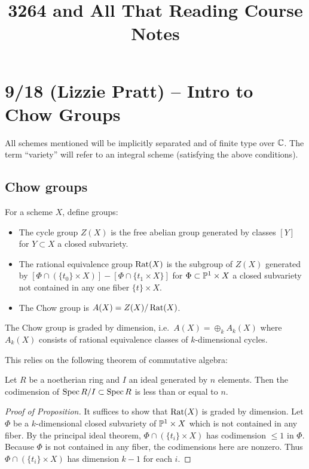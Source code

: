 \documentclass{article}
\title{3264 and All That Reading Course Notes}
\begin{document}
\maketitle

\tableofcontents

\section{9/18 (Lizzie Pratt) -- Intro to Chow Groups}

All schemes mentioned will be implicitly separated and of finite type over $\mathbb{C}$.
The term ``variety'' will refer to an integral scheme (satisfying the above conditions).

\subsection{Chow groups}

\begin{dfn}
	For a scheme $X$, define groups:
	\begin{itemize}
		\item The cycle group $Z(X)$ is the free abelian group generated by classes $[Y]$ for $Y \subset X$ a closed subvariety.
		\item The rational equivalence group $\operatorname{Rat}(X)$ is the subgroup of $Z(X)$ generated by $[\Phi \cap (\{ t_0 \} \times X)] - [\Phi \cap \{ t_1 \times X \}]$ for $\Phi \subset \mathbb{P}^1 \times X$ a closed subvariety not contained in any one fiber $\{ t \} \times X$.
		\item The Chow group is $A(X) = Z(X) / \operatorname{Rat}(X)$.
	\end{itemize}
\end{dfn}

\begin{prop}
	The Chow group is graded by dimension, i.e.\ $A(X) = \oplus_k A_k(X)$ where $A_k(X)$ consists of rational equivalence classes of $k$-dimensional cycles.
\end{prop}

This relies on the following theorem of commutative algebra:

\begin{thm}
	Let $R$ be a noetherian ring and $I$ an ideal generated by $n$ elements.
	Then the codimension of $\operatorname{Spec} R/I \subset \operatorname{Spec} R$ is less than or equal to $n$.
\end{thm}

\begin{proof}[Proof of Proposition]
	It suffices to show that $\operatorname{Rat}(X)$ is graded by dimension.
	Let $\Phi$ be a $k$-dimensional closed subvariety of $\mathbb{P}^1 \times X$ which is not contained in any fiber.
	By the principal ideal theorem, $\Phi \cap (\{ t_i \} \times X)$ has codimension $\leq 1$ in $\Phi$.
	Because $\Phi$ is not contained in any fiber, the codimensions here are nonzero.
	Thus $\Phi \cap (\{ t_i \} \times X)$ has dimension $k-1$ for each $i$.
\end{proof}
\end{document}
